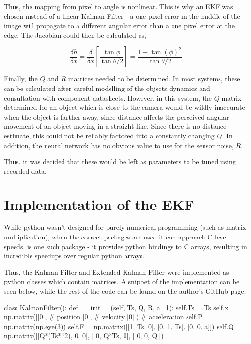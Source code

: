 Thus, the mapping from pixel to angle is nonlinear. This is why an EKF was chosen instead of a linear Kalman Filter - a one pixel error in the middle of the image will propagate to a different angular error than a one pixel error at the edge. The Jacobian could then be calculated as,

\[ \frac{\delta h}{\delta x} = \frac{\delta}{\delta x} \left[ \frac{\tan{\phi}}{\tan{\theta/2}} \right] = \frac{1 + \tan{(\phi)}^2}{\tan{\theta/2}} \]

Finally, the $Q$ and $R$ matrices needed to be determined. In most systems, these can be calculated after careful modelling of the objects dynamics and consultation with component datasheets. However, in this system, the $Q$ matrix determined for an object which is close to the camera would be wildly inaccurate when the object is farther away, since distance affects the perceived angular movement of an object moving in a straight line. Since there is no distance estimate, this could not be reliably factored into a constantly changing $Q$. In addition, the neural network has no obvious value to use for the sensor noise, $R$.

Thus, it was decided that these would be left as parameters to be tuned using recorded data.

\section{Implementation of the EKF}

While python wasn't designed for purely numerical programming (such as matrix multiplication), when the correct packages are used it can approach C-level speeds.  is one such package - it provides python bindings to C arrays, resulting in incredible speedups over regular python arrays.

Thus, the Kalman Filter and Extended Kalman Filter were implemented as python classes which contain  matrices. A snippet of the implementation can be seen below, while the rest of the code can be found on the author's GitHub page. \\

\begin{python}
class KalmanFilter():
    def __init__(self, Ts, Q, R, a=1):
        self.Ts = Ts
        self.x = np.matrix([[0],  # position
                            [0],  # velocity
                            [0]]) # acceleration
        self.P = np.matrix(np.eye(3))
        self.F = np.matrix([[1, Ts,  0],
                            [0,  1, Ts],
                            [0,  0,  a]])
        self.Q = np.matrix([[Q*(Ts**2),    0, 0],
                            [        0, Q*Ts, 0],
                            [        0,    0, Q]])
\end{python}

